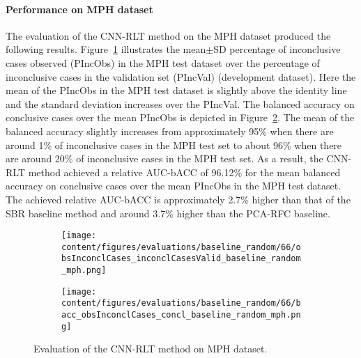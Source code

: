 \paragraph{Performance on MPH dataset}

The evaluation of the CNN-RLT method on the MPH dataset produced the following results.
Figure~\ref{fig:obsInconclCases_inconclCasesValid_baseline_random_mph} illustrates
the mean$\pm$SD percentage of inconclusive cases observed (PIncObs) in the MPH test dataset 
over the percentage of inconclusive cases in the validation set (PIncVal) (development dataset).
Here the mean of the PIncObs in the MPH test dataset is slightly above the identity line 
and the standard deviation increases over the PIncVal.
The balanced accuracy on conclusive cases over the mean PIncObs is depicted 
in Figure~\ref{fig:bacc_obsInconclCases_concl_baseline_random_mph}.
The mean of the balanced accuracy slightly increases from approximately 95\% 
when there are around 1\% of inconclusive cases in the MPH test set to about 96\% 
when there are around 20\% of inconclusive cases in the MPH test set.
As a result, the CNN-RLT method achieved a relative AUC-bACC of 96.12\% for the mean balanced accuracy on conclusive cases 
over the mean PIncObs in the MPH test dataset.
The achieved relative AUC-bACC is approximately 2.7\% higher than that of the SBR baseline method 
and around 3.7\% higher than the PCA-RFC baseline.


\begin{figure}[ht]
  \begin{subfigure}{0.49\textwidth}
    \centering
    \texttt{[image: content/figures/evaluations/baseline\_random/66/obsInconclCases\_inconclCasesValid\_baseline\_random\_mph.png]}
    \label{fig:obsInconclCases_inconclCasesValid_baseline_random_mph}
  \end{subfigure}
  \hfill
  \begin{subfigure}{0.49\textwidth}
    \centering
    \texttt{[image: content/figures/evaluations/baseline\_random/66/bacc\_obsInconclCases\_concl\_baseline\_random\_mph.png]}
    \label{fig:bacc_obsInconclCases_concl_baseline_random_mph}
  \end{subfigure}
  \caption{Evaluation of the CNN-RLT method on MPH dataset.}
  \label{fig:perf_eval_rlt_mph}
\end{figure}


